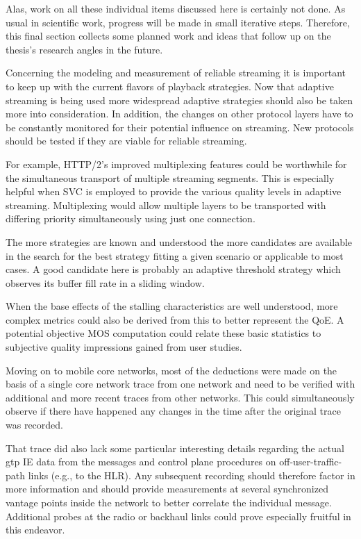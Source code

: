 Alas, work on all these individual items discussed here is certainly not done. As usual in scientific work, progress will be made in small iterative steps. Therefore, this final section collects some planned work and ideas that follow up on the thesis's research angles in the future.

Concerning the modeling and measurement of reliable streaming it is important to keep up with the current flavors of playback strategies. Now that adaptive streaming is being used more widespread adaptive strategies should also be taken more into consideration. In addition, the changes on other protocol layers have to be constantly monitored for their potential influence on streaming. New protocols should be tested if they are viable for reliable streaming. 

For example, \gls{HTTP}/2's improved multiplexing features could be worthwhile for the simultaneous transport of multiple streaming segments. This is especially helpful when \gls{SVC} is employed to provide the various quality levels in adaptive streaming. Multiplexing would allow multiple layers to be transported with differing priority simultaneously using just one connection.

The more strategies are known and understood the more candidates are available in the search for the best strategy fitting a given scenario or applicable to most cases. A good candidate here is probably an adaptive threshold strategy which observes its buffer fill rate in a sliding window.

When the base effects of the stalling characteristics are well understood, more complex metrics could also be derived from this to better represent the \gls{QoE}. A potential objective \gls{MOS} computation could relate these basic statistics to subjective quality impressions gained from user studies.

Moving on to mobile core networks, most of the deductions were made on the basis of a single core network trace from one network and need to be verified with additional and more recent traces from other networks. This could simultaneously observe if there have happened any changes in the time after the original trace was recorded.

That trace did also lack some particular interesting details regarding the actual \gls{gtp} \gls{IE} data from the messages and control plane procedures on off-user-traffic-path links (e.g., to the \gls{HLR}). Any subsequent recording should therefore factor in more information and should provide measurements at several synchronized vantage points inside the network to better correlate the individual message. Additional probes at the radio or backhaul links could prove especially fruitful in this endeavor. 

